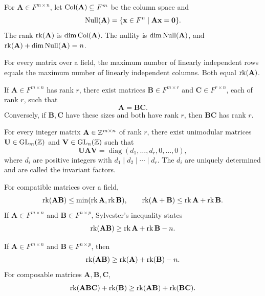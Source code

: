 \begin{definition}
For $\mathbf{A}\in F^{m\times n}$, let $\operatorname{Col}(\mathbf{A})\subseteq F^m$ be the column space and
\[
 \operatorname{Null}(\mathbf{A})=\{\mathbf{x}\in F^n\mid\mathbf{A}\mathbf{x}=\mathbf0\}.
\]
The rank $\operatorname{rk}(\mathbf{A})$ is $\dim\operatorname{Col}(\mathbf{A})$. The nullity is $\dim\operatorname{Null}(\mathbf{A})$, and $\operatorname{rk}(\mathbf{A})+\dim\operatorname{Null}(\mathbf{A})=n$.
\end{definition}

\begin{theorem}
For every matrix over a field, the maximum number of linearly independent rows equals the maximum number of linearly independent columns. Both equal $\operatorname{rk}(\mathbf{A})$.
\end{theorem}

\begin{theorem}
If $\mathbf{A}\in F^{m\times n}$ has rank $r$, there exist matrices $\mathbf{B}\in F^{m\times r}$ and $\mathbf{C}\in F^{r\times n}$, each of rank $r$, such that
\[
 \mathbf{A}=\mathbf{B}\mathbf{C}.
\]
Conversely, if $\mathbf{B},\mathbf{C}$ have these sizes and both have rank $r$, then $\mathbf{B}\mathbf{C}$ has rank $r$.
\end{theorem}

\begin{theorem}
For every integer matrix $\mathbf{A}\in\mathbb{Z}^{m\times n}$ of rank $r$, there exist unimodular matrices $\mathbf{U}\in\mathrm{GL}_m(\mathbb{Z})$ and $\mathbf{V}\in\mathrm{GL}_n(\mathbb{Z})$ such that
\[
 \mathbf{U}\mathbf{A}\mathbf{V}=
 \operatorname{diag}(d_1,\dots,d_r,0,\dots,0),
\]
where $d_i$ are positive integers with $d_1\mid d_2\mid\cdots\mid d_r$. The $d_i$ are uniquely determined and are called the invariant factors.
\end{theorem}

\begin{theorem}
For compatible matrices over a field,
\[
 \operatorname{rk}(\mathbf{A}\mathbf{B})\le\min(\operatorname{rk}\mathbf{A},\operatorname{rk}\mathbf{B}),
 \qquad \operatorname{rk}(\mathbf{A}+\mathbf{B})\le\operatorname{rk}\mathbf{A}+\operatorname{rk}\mathbf{B}.
\]
If $\mathbf{A}\in F^{m\times n}$ and $\mathbf{B}\in F^{n\times p}$, Sylvester's inequality states
\[
 \operatorname{rk}(\mathbf{A}\mathbf{B})\ge\operatorname{rk}\mathbf{A}+\operatorname{rk}\mathbf{B}-n.
\]
\end{theorem}

\begin{theorem}
If $\mathbf{A}\in F^{m\times n}$ and $\mathbf{B}\in F^{n\times p}$, then
\[
 \operatorname{rk}(\mathbf{A}\mathbf{B})\ge\operatorname{rk}(\mathbf{A})+\operatorname{rk}(\mathbf{B})-n.
\]
For composable matrices $\mathbf{A},\mathbf{B},\mathbf{C}$,
\[
 \operatorname{rk}(\mathbf{A}\mathbf{B}\mathbf{C})+\operatorname{rk}(\mathbf{B})
 \ge\operatorname{rk}(\mathbf{A}\mathbf{B})+\operatorname{rk}(\mathbf{B}\mathbf{C}).
\]
\end{theorem}

